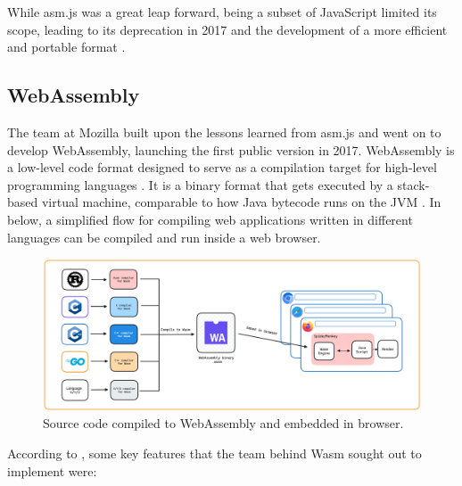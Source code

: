 \documentclass[
  table]{report}
\begin{document}
While asm.js was a great leap forward, being a subset of JavaScript
limited its scope, leading to its deprecation in 2017 and the
development of a more efficient and portable format
\citep{webassembly.orgFAQWebAssembly}.

\subsection{WebAssembly}

The team at Mozilla built upon the lessons learned from asm.js and went
on to develop WebAssembly, launching the first public version in 2017.
WebAssembly is a low-level code format designed to serve as a
compilation target for high-level programming languages
\citep{haasBringingWebSpeed2017}. It is a binary format that gets
executed by a stack-based virtual machine, comparable to how Java
bytecode runs on the \ac{JVM} \citep{haasBringingWebSpeed2017}. In
 below, a simplified flow for compiling web
applications written in different languages can be compiled and run
inside a web browser.

\begin{figure}[H]
\centering
  \includegraphics{assets/wasm-browser.png}
  \caption{Source code compiled to WebAssembly and embedded in browser.}
  \label{fig:wasm-browser}
\end{figure}

According to \citet{haasBringingWebSpeed2017}, some key features that
the team behind \ac{Wasm} sought out to implement were:
\end{document}
